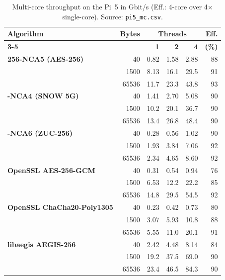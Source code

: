 \begin{table}[!htbp]
\centering
\caption{Multi-core throughput on the Pi~5 in Gbit/s (Eff.: 4-core over 4$\times$ single-core). Source: \texttt{pi5\_mc.csv}.}
\label{tab:s-mc-pi5}
\footnotesize
\begin{tabular}{@{}>{\bfseries}l r r r r r@{}}
\toprule
\textbf{Algorithm} & \textbf{Bytes} & \multicolumn{3}{c}{\textbf{Threads}} & \textbf{Eff.} \\
\cmidrule(lr){3-5}
& & \textbf{1} & \textbf{2} & \textbf{4} & \textbf{(\%)} \\
\midrule
256-NCA5 (AES-256) & 40 & 0.82 & 1.58 & 2.88 & 88 \\
 & 1500 & 8.13 & 16.1 & 29.5 & 91 \\
 & 65536 & 11.7 & 23.3 & 43.8 & 93 \\
\addlinespace[2pt]
256-NCA4 (SNOW 5G) & 40 & 1.41 & 2.70 & 5.08 & 90 \\
 & 1500 & 10.2 & 20.1 & 36.7 & 90 \\
 & 65536 & 13.4 & 26.8 & 48.4 & 90 \\
\addlinespace[2pt]
256-NCA6 (ZUC-256) & 40 & 0.28 & 0.56 & 1.02 & 90 \\
 & 1500 & 1.93 & 3.84 & 7.06 & 92 \\
 & 65536 & 2.34 & 4.65 & 8.60 & 92 \\
\addlinespace[2pt]
OpenSSL AES-256-GCM & 40 & 0.31 & 0.54 & 0.94 & 76 \\
 & 1500 & 6.53 & 12.2 & 22.2 & 85 \\
 & 65536 & 14.8 & 29.5 & 54.5 & 92 \\
\addlinespace[2pt]
OpenSSL ChaCha20-Poly1305 & 40 & 0.23 & 0.42 & 0.73 & 80 \\
 & 1500 & 3.07 & 5.93 & 10.8 & 88 \\
 & 65536 & 5.55 & 11.0 & 20.1 & 91 \\
\addlinespace[2pt]
libaegis AEGIS-256 & 40 & 2.42 & 4.48 & 8.14 & 84 \\
 & 1500 & 19.2 & 37.5 & 69.0 & 90 \\
 & 65536 & 23.4 & 46.5 & 84.3 & 90 \\
\bottomrule
\end{tabular}
\end{table}

